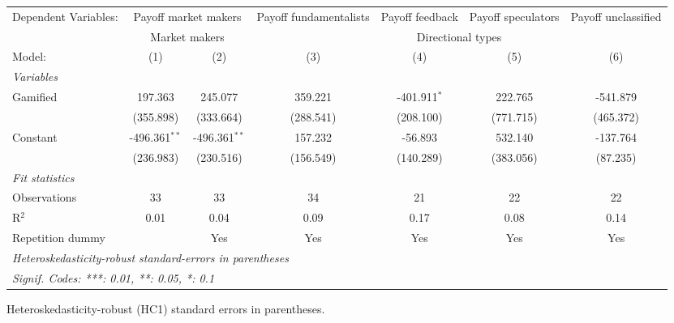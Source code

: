 \begingroup
\centering
\begin{tabular}{lcccccc}
   \tabularnewline \midrule \midrule
   Dependent Variables: & \multicolumn{2}{c}{Payoff market makers} & Payoff fundamentalists & Payoff feedback & Payoff speculators & Payoff unclassified\\
    & \multicolumn{2}{c}{Market makers} & \multicolumn{4}{c}{Directional types} \\ 
   Model:           & (1)             & (2)             & (3)       & (4)            & (5)       & (6)\\  
   \midrule
   \emph{Variables}\\
   Gamified         & 197.363         & 245.077         & 359.221   & -401.911$^{*}$ & 222.765   & -541.879\\   
                    & (355.898)       & (333.664)       & (288.541) & (208.100)      & (771.715) & (465.372)\\   
   Constant         & -496.361$^{**}$ & -496.361$^{**}$ & 157.232   & -56.893        & 532.140   & -137.764\\   
                    & (236.983)       & (230.516)       & (156.549) & (140.289)      & (383.056) & (87.235)\\   
   \midrule
   \emph{Fit statistics}\\
   Observations     & 33              & 33              & 34        & 21             & 22        & 22\\  
   R$^2$            & 0.01            & 0.04            & 0.09      & 0.17           & 0.08      & 0.14\\  
   Repetition dummy &                 & Yes             & Yes       & Yes            & Yes       & Yes\\  
   \midrule \midrule
   \multicolumn{7}{l}{\emph{Heteroskedasticity-robust standard-errors in parentheses}}\\
   \multicolumn{7}{l}{\emph{Signif. Codes: ***: 0.01, **: 0.05, *: 0.1}}\\
\end{tabular}
 
\par \raggedright 
Heteroskedasticity-robust (HC1) standard errors in parentheses.
\par\endgroup
